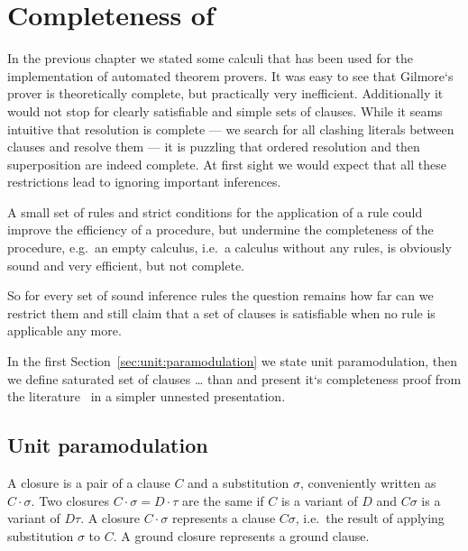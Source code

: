 
\chapter{Completeness of \InstGenEQ}

In the previous chapter we stated some calculi
that has been used for the implementation
of automated theorem provers.
%
It was easy to see that Gilmore`s prover is theoretically complete,
but practically very inefficient.
Additionally it would not stop for clearly satisfiable and simple sets of clauses.
While it seams intuitive that resolution is complete
--- we search for all clashing literals between clauses and resolve them ---
it is puzzling that ordered resolution and then superposition are indeed complete.
At first sight we would expect that all these restrictions
lead to ignoring important inferences.

A small set of rules and strict conditions for the application of a rule
could improve the efficiency of a procedure, but undermine the completeness
of the procedure, e.g.~an empty calculus,
i.e.~a calculus without any rules,
is obviously sound and very efficient, but not complete.

So for every set of sound inference rules the question remains
how far can we restrict them and still claim
that a set of clauses is satisfiable when no rule is applicable any more.







In the first Section~\vref{sec:unit:paramodulation}
we state unit paramodulation,
then we define saturated set of clauses …
than and present it`s completeness proof
from the literature~\cite{GK2004csl} in a simpler unnested presentation.


\section{Unit paramodulation}\label{sec:unit:paramodulation}

\begin{definition}
    A closure is a pair of a clause \( C \) and a substitution \( \sigma \),
    conveniently written as \( C\cdot\sigma \). Two closures \( C\cdot\sigma = D\cdot\tau \)
    are the same if \( C \) is a variant of \( D \) and \( C\sigma \) is a variant of \( D\tau \).
    A closure \( C\cdot\sigma \) represents a clause \( C\sigma \),
    i.e.~the result of applying substitution \( \sigma \) to \( C \).
    A ground closure represents a ground clause.
\end{definition}

